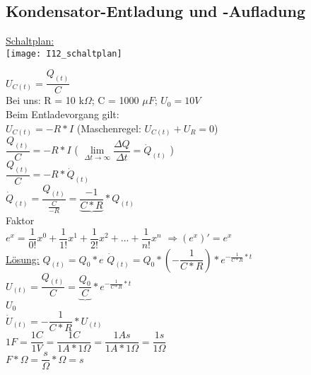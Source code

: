 \subsection{Kondensator-Entladung und -Aufladung}
\underline{Schaltplan:}
\vspace{2mm} \\
\texttt{[image: I12\_schaltplan]}
\vspace{2mm}

$ U_{C(t)} = \dfrac{Q_{(t)}}{C} $
\vspace{2mm} \\
Bei uns: R = 10 k$\Omega$; C = 1000 $ \mu F $; $U_{0} = 10V$ \\
Beim Entladevorgang gilt: \\
\vspace{3mm}
$ U_{C(t)} = -R \ast I $ \hspace{40mm} (Maschenregel: $U_{C(t)} + U_{R} = 0$)
\vspace{5mm} \\
$ \dfrac{Q_{(t)}}{C} = -R \ast I $ \hspace{40mm} ( $\lim\limits_{\Delta t \rightarrow \infty}{\dfrac{\Delta Q}{\Delta t}} = \dot{Q}_{(t)}$ )
\vspace{5mm} \\
$ \dfrac{Q_{(t)}}{C} = -R \ast \dot{Q}_{(t)} $
\vspace{5mm} \\
$ \dot{Q}_{(t)} = \dfrac{Q_{(t)}}{\frac{C}{-R}} = \underbrace{\dfrac{-1}{C \ast R}} \ast Q_{(t)}$ \\
\hspace{24mm} Faktor
\vspace{5mm} \\
$ e^{x} = \dfrac{1}{0!}x^{0} + \dfrac{1}{1!}x^{1} + \dfrac{1}{2!}x^{2} + ... + \dfrac{1}{n!}x^{n}$ \hspace{2mm} $ \Rightarrow (e^{x})' = e^{x} $
\vspace{3mm} \\
\underline{Lösung:} $ Q_{(t)} = Q_{0} \ast e $ \hspace{15mm} $ \dot{Q}_{(t)} = Q_{0} \ast (-\dfrac{1}{C \ast R}) \ast e^{-\frac{1}{C \ast R} \ast t} $
\vspace{10mm} \\
$ U_{(t)} = \dfrac{Q_{(t)}}{C} = \underbrace{\dfrac{Q_{0}}{C}} \ast e^{-\frac{1}{C \ast R} \ast t} $ \\
\hspace{25.5mm} $U_{0}$
\vspace{5mm} \\
$ \dot{U}_{(t)} = - \dfrac{1}{C \ast R} \ast U_{(t)} $
\vspace{5mm} \\
$ 1F = \dfrac{1C}{1V} = \dfrac{1C}{1A \ast 1 \Omega} = \dfrac{1 As}{1A \ast 1 \Omega} = \dfrac{1s}{1 \Omega} $
\vspace{5mm} \\
$ F \ast \Omega = \dfrac{s}{\Omega} \ast \Omega = s $

